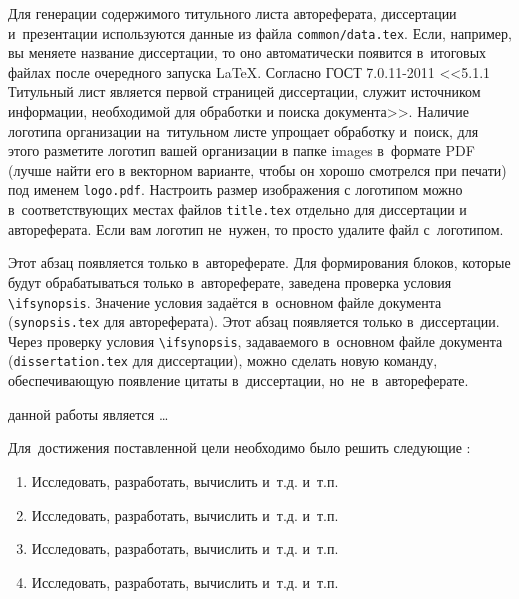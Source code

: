 Для генерации содержимого титульного листа автореферата, диссертации
и~презентации используются данные из файла \verb!common/data.tex!. Если,
например, вы меняете название диссертации, то оно автоматически
появится в~итоговых файлах после очередного запуска \LaTeX. Согласно
ГОСТ 7.0.11-2011 <<5.1.1 Титульный лист является первой страницей
диссертации, служит источником информации, необходимой для обработки и
поиска документа>>. Наличие логотипа организации на~титульном листе
упрощает обработку и~поиск, для этого разметите логотип вашей
организации в папке images в~формате PDF (лучше найти его в векторном
варианте, чтобы он хорошо смотрелся при печати) под именем
\verb!logo.pdf!. Настроить размер изображения с логотипом можно
в~соответствующих местах файлов \verb!title.tex!  отдельно для
диссертации и автореферата. Если вам логотип не~нужен, то просто
удалите файл с~логотипом.

\ifsynopsis
Этот абзац появляется только в~автореферате.
Для формирования блоков, которые будут обрабатываться только в~автореферате,
заведена проверка условия \verb!\!\verb!ifsynopsis!.
Значение условия задаётся в~основном файле документа (\verb!synopsis.tex! для
автореферата).
\else
Этот абзац появляется только в~диссертации.
Через проверку условия \verb!\!\verb!ifsynopsis!, задаваемого в~основном файле
документа (\verb!dissertation.tex! для диссертации), можно сделать новую
команду, обеспечивающую появление цитаты в~диссертации, но~не~в~автореферате.
\fi


{\aim} данной работы является \ldots

Для~достижения поставленной цели необходимо было решить следующие {\tasks}:
\begin{enumerate}[beginpenalty=10000] %
  \item Исследовать, разработать, вычислить и~т.\:д. и~т.\:п.
  \item Исследовать, разработать, вычислить и~т.\:д. и~т.\:п.
  \item Исследовать, разработать, вычислить и~т.\:д. и~т.\:п.
  \item Исследовать, разработать, вычислить и~т.\:д. и~т.\:п.
\end{enumerate}


